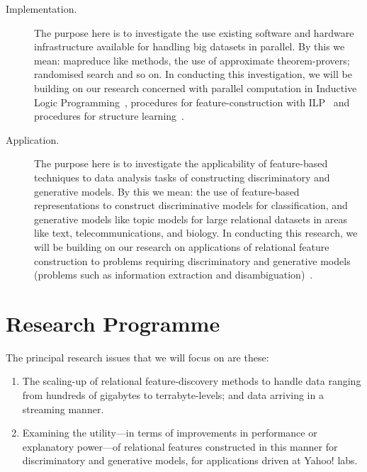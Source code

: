 \documentclass[11pt]{article}
\begin{document}
\begin{description}
    \item[Implementation.] The purpose here is to investigate the use existing software and hardware infrastructure available
        for handling big datasets in parallel. By this we mean: mapreduce like methods, the use of approximate
        theorem-provers; randomised search and so on. In conducting this investigation, we will be building
        on our research concerned with parallel computation in Inductive Logic Programming~\cite{SrinivasanFJ12,FonsecaSSC09}, procedures for feature-construction with ILP~\cite{CostaSCBDJSVL03,PaesZZPS06,Srinivasan99} and procedures for structure learning~\cite{hipc2010}.

	\iffalse
	({\bf Ganesh: } Include all work done
        by me on parallel ILP including recent work on mapreduce and previous work with the Porto group;
        and also my work on randomised search with Filip and the query transformation work with Vitor et al;
        and the very old work on data sampling for large search spaces).
	\fi
    \item[Application.] The purpose here is to investigate the applicability of feature-based techniques to
        data analysis tasks of constructing discriminatory and generative models. By this we mean: the use
        of feature-based representations to construct discriminative models for classification, and generative
        models like topic models for large relational datasets in areas like text, telecommunications, and biology.
        In conducting this research, we will be building on our research on applications of relational
        feature construction to problems requiring discriminatory and generative models (problems such as information extraction and disambiguation)~\cite{NageshRCKDB12,KulkarniSRC09,ChalamallaNSR08,SpeciaSJRN09,RamakrishnanJBS07,SpeciaSRN06}.

\end{description}

\section{Research Programme}

The principal research issues that we will focus on are these:

\begin{enumerate}
    \item The scaling-up of relational feature-discovery methods to
        handle data ranging from hundreds of gigabytes to terrabyte-levels; and
        data arriving in a streaming manner.
    \item Examining the utility---in terms of improvements in performance or
        explanatory power---of relational features constructed in this
        manner for discriminatory and generative models, for applications driven at Yahoo! labs.
\end{enumerate}
\end{document}
